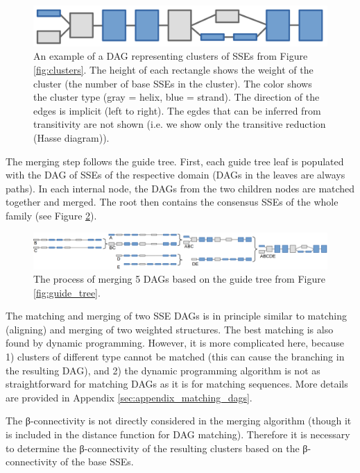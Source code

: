 \documentclass{article}
\begin{document}
\begin{figure}[h!]
  \centering\includegraphics[width=0.6\linewidth]{figures/dag_ABCDE.png}
  \caption{An example of a DAG representing clusters of SSEs from Figure \ref{fig:clusters}. 
  The height of each rectangle shows the weight of the cluster (the number of base SSEs in the cluster).
  The color shows the cluster type (gray = helix, blue = strand).
  The direction of the edges is implicit (left to right).
  The egdes that can be inferred from transitivity are not shown 
  (i.e. we show only the transitive reduction (Hasse diagram)). }
  \label{fig:dag_example}
\end{figure}

The merging step follows the guide tree. First, each guide tree leaf is
populated with the DAG of SSEs of the respective domain (DAGs in the leaves are always paths). 
In each internal node, the DAGs from the two children nodes are matched together and merged. 
The root then contains the consensus SSEs of the whole family (see Figure \ref{fig:dag_merging}). 

\begin{figure}[h!]
  \centering\includegraphics[width=\linewidth]{figures/dag_merging.png}
  \caption{The process of merging 5 DAGs based on the guide tree from Figure \ref{fig:guide_tree}.}
  \label{fig:dag_merging}
\end{figure}

The matching and merging of two SSE DAGs is in principle similar to matching (aligning)
and merging of two weighted structures. 
The best matching is also found by dynamic programming.
However, it is more complicated here, because 
1) clusters of different type cannot be matched (this can cause the
branching in the resulting DAG), 
and 2) the dynamic programming algorithm is not as straightforward 
for matching DAGs as it is for matching sequences.
More details are provided in Appendix \ref{sec:appendix_matching_dags}.

The β-connectivity is not directly considered in the merging algorithm 
(though it is included in the distance function for DAG matching).
Therefore it is necessary to determine the β-connectivity of the resulting clusters 
based on the β-connectivity of the base SSEs.
\end{document}
